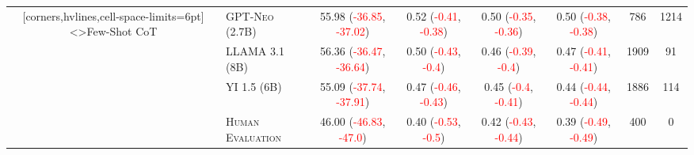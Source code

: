 \documentclass[twocolumn]{article}
\begin{document}
\begin{table}
\begin{NiceTabular}{cl*{6}{c}}[corners,hvlines,cell-space-limits=6pt]
<\rotate>{Few-Shot CoT}
	 & \textsc{GPT-Neo (2.7B)} & 55.98 (\textcolor{Red}{-36.85}, \textcolor{Red}{-37.02}) & 0.52 (\textcolor{Red}{-0.41}, \textcolor{Red}{-0.38}) & 0.50 (\textcolor{Red}{-0.35}, \textcolor{Red}{-0.36}) & 0.50 (\textcolor{Red}{-0.38}, \textcolor{Red}{-0.38}) & 786 & 1214 \\
	 & \textsc{LLAMA 3.1 (8B)} & 56.36 (\textcolor{Red}{-36.47}, \textcolor{Red}{-36.64}) & 0.50 (\textcolor{Red}{-0.43}, \textcolor{Red}{-0.4}) & 0.46 (\textcolor{Red}{-0.39}, \textcolor{Red}{-0.4}) & 0.47 (\textcolor{Red}{-0.41}, \textcolor{Red}{-0.41}) & 1909 & 91 \\
	 & \textsc{YI 1.5 (6B)} & 55.09 (\textcolor{Red}{-37.74}, \textcolor{Red}{-37.91}) & 0.47 (\textcolor{Red}{-0.46}, \textcolor{Red}{-0.43}) & 0.45 (\textcolor{Red}{-0.4}, \textcolor{Red}{-0.41}) & 0.44 (\textcolor{Red}{-0.44}, \textcolor{Red}{-0.44}) & 1886 & 114 \\

	 & \textsc{Human Evaluation} & 46.00 (\textcolor{Red}{-46.83}, \textcolor{Red}{-47.0}) & 0.40 (\textcolor{Red}{-0.53}, \textcolor{Red}{-0.5}) & 0.42 (\textcolor{Red}{-0.43}, \textcolor{Red}{-0.44}) & 0.39 (\textcolor{Red}{-0.49}, \textcolor{Red}{-0.49}) & 400 & 0 \\

\end{NiceTabular}
\end{table}
\end{document}
